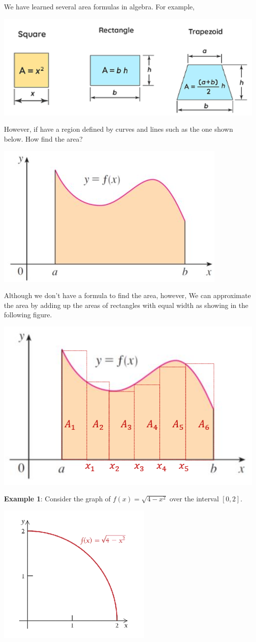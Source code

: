 \documentclass[
]{book}
\begin{document}
We have learned several area formulas in algebra. For example,

\begin{center}\includegraphics[width=0.6\linewidth]{img12/areaFormulas} \end{center}

However, if have a region defined by curves and lines such as the one shown below. How find the area?

\begin{center}\includegraphics[width=0.4\linewidth]{img12/areaUnderCurve} \end{center}

Although we don't have a formula to find the area, however, We can approximate the area by adding up the areas of rectangles with equal width as showing in the following figure.

\begin{center}\includegraphics[width=0.4\linewidth]{img12/ApproximatingIrregularRegion} \end{center}

\textbf{Example 1}: Consider the graph of \(f(x) = \sqrt{4-x^2}\) over the interval \([0,2]\).

\begin{center}\includegraphics[width=0.35\linewidth]{img12/quarterCircle} \end{center}
\end{document}

